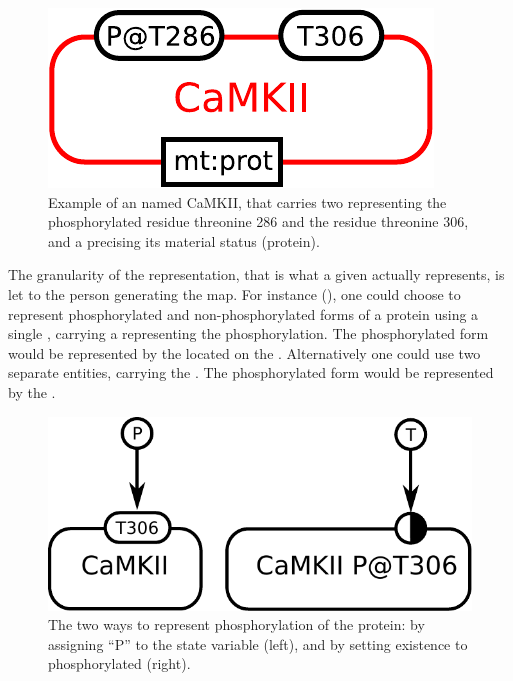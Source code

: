 
\begin{figure}[H]
  \centering
  \includegraphics[scale = 0.5]{examples/ex-entity}
  \caption{Example of an  named CaMKII, that carries two  representing the phosphorylated residue threonine 286 and the residue threonine 306, and a  precising its material status (protein).}
  \label{fig:ex-entity}
\end{figure}

The granularity of the representation, that is what a given  actually represents, is let to the person generating the map. For instance (), one could choose to represent phosphorylated and non-phosphorylated forms of a protein using a single , carrying a  representing the phosphorylation. The phosphorylated form would be represented by the  located on the . Alternatively one could use two separate entities, carrying the  . The phosphorylated form would be represented by the .

\begin{figure}[H]
  \centering
  \includegraphics[scale = 0.5]{images/entity-granularity}
  \caption{The two ways to represent phosphorylation of the protein: by assigning ``P'' to the state variable (left), and by setting existence to phosphorylated  (right).}
  \label{fig:entity-granularity}
\end{figure}

